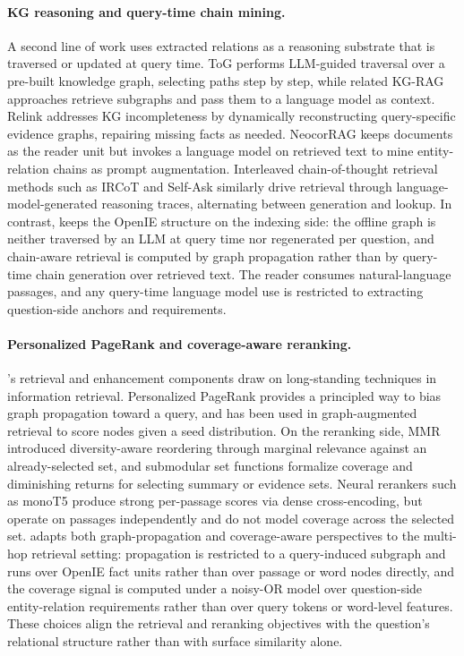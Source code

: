 \paragraph{KG reasoning and query-time chain mining.}
A second line of work uses extracted relations as a reasoning substrate
that is traversed or updated at query time. ToG \citep{sun2024tog}
performs LLM-guided traversal over a pre-built knowledge graph,
selecting paths step by step, while related KG-RAG approaches
\citep{baek2023kaping} retrieve subgraphs and pass them to a language
model as context. Relink \citep{huang2026relink} addresses KG
incompleteness by dynamically reconstructing query-specific evidence
graphs, repairing missing facts as needed. NeocorRAG
\citep{peng2026neocorrag} keeps documents as the reader unit but
invokes a language model on retrieved text to mine entity-relation
chains as prompt augmentation. Interleaved chain-of-thought retrieval
methods such as IRCoT \citep{trivedi2023ircot} and Self-Ask
\citep{press2023selfask} similarly drive retrieval through
language-model-generated reasoning traces, alternating between
generation and lookup. In contrast, \methodname{} keeps the OpenIE
structure on the indexing side: the offline graph is neither traversed
by an LLM at query time nor regenerated per question, and chain-aware
retrieval is computed by graph propagation rather than by query-time
chain generation over retrieved text. The reader consumes
natural-language passages, and any query-time language model use is
restricted to extracting question-side anchors and requirements.

\paragraph{Personalized PageRank and coverage-aware reranking.}
\methodname{}'s retrieval and enhancement components draw on
long-standing techniques in information retrieval. Personalized
PageRank \citep{haveliwala2002topic,jeh2003scaling} provides a
principled way to bias graph propagation toward a query, and has been
used in graph-augmented retrieval to score nodes given a seed
distribution. On the reranking side, MMR \citep{carbonell1998mmr}
introduced diversity-aware reordering through marginal relevance
against an already-selected set, and submodular set functions
\citep{lin2011submodular} formalize coverage and diminishing returns for
selecting summary or evidence sets. Neural rerankers such as monoT5
\citep{nogueira2020monot5} produce strong per-passage scores via dense
cross-encoding, but operate on passages independently and do not model
coverage across the selected set. \methodname{} adapts both
graph-propagation and coverage-aware perspectives to the multi-hop
retrieval setting: propagation is restricted to a query-induced
subgraph and runs over OpenIE fact units rather than over passage or
word nodes directly, and the coverage signal is computed under a
noisy-OR model over question-side entity-relation requirements rather
than over query tokens or word-level features. These choices align the
retrieval and reranking objectives with the question's relational
structure rather than with surface similarity alone.
